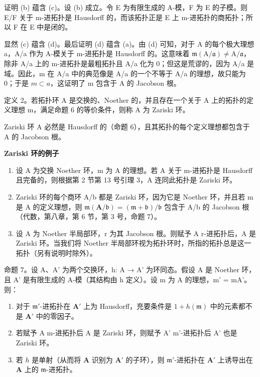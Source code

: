 证明 (b) 蕴含 (c)。设 (b) 成立。令 E 为有限生成的 A-模，F 为 E 的子模。则 E/F 关于 m-进拓扑是 Hausdorff 的，而该拓扑正是 E 上 m-进拓扑的商拓扑；所以 F 在 E 中是闭的。

显然 (c) 蕴含 (d)。最后证明 (d) 蕴含 (a)。由 (d) 可知，对于 A 的每个极大理想 a，A/a 作为 A-模关于 m-进拓扑是 Hausdorff 的。这意味着 \(\mathfrak{m}(\mathrm{A}/\mathfrak{a}) \neq \mathrm{A}/\mathfrak{a}\)，除非 A/a 上的 m-进拓扑是最粗拓扑且 A/a 化为 0；但这是荒谬的，因为 A/a 是域。因此，m 在 A/a 中的典范像是 A/a 的一个不等于 A/a 的理想，故只能为 0；于是 \(m \subset a\)，这证明了 m 包含于 A 的 Jacobson 根。

定义 2。若拓扑环 A 是交换的、Noether 的，并且存在一个关于 A 上的拓扑的定义理想 m，满足命题 6 的等价条件，则称 A 为 Zariski 环。

Zariski 环 A 必然是 Hausdorff 的（命题 6），且其拓扑的每个定义理想都包含于 A 的 Jacobson 根。

\textbf{Zariski 环的例子}\par

\begin{enumerate}
\def\labelenumi{(\arabic{enumi})}
\item
  设 A 为交换 Noether 环，m 为 A 的理想。若 A 关于 m-进拓扑是 Hausdorff 且完备的，则根据第 2 节第 13 号引理 3，A 连同此拓扑是 Zariski 环。
\item
  Zariski 环的每个商环 A/b 都是 Zariski 环，因为它是 Noether 环，并且若 m 是 A 的定义理想，则 \(\mathfrak{m}(\mathbf{A}/\mathfrak{b}) = (\mathfrak{m} + \mathfrak{b})/\mathfrak{b}\) 包含于 A/b 的 Jacobson 根（代数，第八章，第 6 节，第 3 号，命题 7）。
\item
  设 A 为 Noether 半局部环，r 为其 Jacobson 根。则赋予 A r-进拓扑后，A 是 Zariski 环。当我们将 Noether 半局部环视为拓扑环时，所指的拓扑总是这一拓扑（另有说明时除外）。
\end{enumerate}

命题 7。设 A、A' 为两个交换环，h: A → A' 为环同态。假设 A 是 Noether 环，且 A' 是有限生成的 A-模（其结构由 h 定义）。设 m 为 A 的理想，m' = mA'。则：

\begin{enumerate}
\def\labelenumi{(\roman{enumi})}
\item
  对于 \(\mathfrak{m}'\)-进拓扑在 \(\mathbf{A}'\) 上为 Hausdorff，充要条件是 \(1 + h(\mathfrak{m})\) 中的元素都不是 \(\mathbf{A}'\) 中的零因子。
\item
  若赋予 A m-进拓扑后 A 是 Zariski 环，则赋予 A' m'-进拓扑后 A' 也是 Zariski 环。
\item
  若 \(h\) 是单射（从而将 \(\mathbf{A}\) 识别为 \(\mathbf{A}'\) 的子环），则 \(\mathfrak{m}'\)-进拓扑在 \(\mathbf{A}'\) 上诱导出在 \(\mathbf{A}\) 上的 \(\mathfrak{m}\)-进拓扑。
\end{enumerate}

